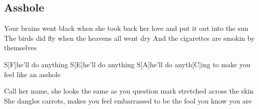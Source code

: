 \subsection*{Asshole   }
\begin{guitar}
Your brains went black when she took back her love 
and put it out into the sun 
The birds did fly when the heavens all went dry 
And the cigarettes are smokin by themselves 



S[F]he'll do anything 
S[E]he'll do anything 
S[A]he'll do anyth[C]ing to make you feel like an asshole 



Call her name, she looks the same as you 
question mark stretched across the skin 
She dangles carrots, makes you feel embarrassed 
to be the fool you know you are 
\end{guitar}
